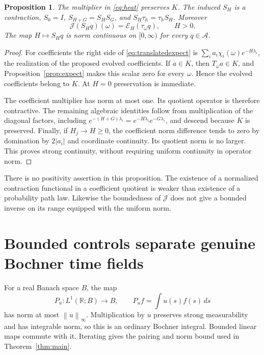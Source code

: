 \documentclass[11pt]{article}
\newtheorem{proposition}[theorem]{Proposition}
\theoremstyle{remark}\newtheorem{remark}[theorem]{Remark}
\newcommand{\R}{\mathbb R}\newcommand{\C}{\mathbb C}
\newcommand{\A}{\mathcal A}\newcommand{\X}{\mathcal X}
\newcommand{\E}{\mathcal E}\newcommand{\norm}[1]{\left\lVert#1\right\rVert}
\begin{document}
\begin{proposition}\label{prop:heat}
The multiplier in \eqref{eq:heat} preserves $K$. The induced $S_H$ is a contraction, $S_0=I$, $S_{H+G}=S_HS_G$, and $S_H\tau_h=\tau_hS_H$. Moreover
\begin{equation}\label{eq:translatedexpect}
 \mathcal J(S_Hq)(\omega)=\E_H(\tau_\omega q),\qquad H>0.
\end{equation}
The map $H\mapsto S_Hq$ is norm continuous on $[0,\infty)$ for every $q\in\A$.
\end{proposition}
\begin{proof}
For coefficients the right side of \eqref{eq:translatedexpect} is $\sum_i a_i\chi_i(\omega)e^{-H\lambda_i}$, the realization of the proposed evolved coefficients. If $a\in K$, then $T_\omega a\in K$, and Proposition~\ref{prop:expect} makes this scalar zero for every $\omega$. Hence the evolved coefficients belong to $K$. At $H=0$ preservation is immediate.

The coefficient multiplier has norm at most one. Its quotient operator is therefore contractive. The remaining algebraic identities follow from multiplication of the diagonal factors, including $e^{-(H+G)\lambda_i}=e^{-H\lambda_i}e^{-G\lambda_i}$, and descend because $K$ is preserved. Finally, if $H_j\to H\ge0$, the coefficient norm difference tends to zero by domination by $2|a_i|$ and coordinate continuity. Its quotient norm is no larger. This proves strong continuity, without requiring uniform continuity in operator norm.
\end{proof}

There is no positivity assertion in this proposition. The existence of a normalized contraction functional in a coefficient quotient is weaker than existence of a probability path law. Likewise the boundedness of $\mathcal J$ does not give a bounded inverse on its range equipped with the uniform norm.

\section{Bounded controls separate genuine Bochner time fields}\label{sec:bochner}
For a real Banach space $B$, the map
\[
 P_u:L^1(\R;B)\to B,\qquad P_uf=\int u(s)f(s)\,ds
\]
has norm at most $\norm u_\infty$. Multiplication by $u$ preserves strong measurability and has integrable norm, so this is an ordinary Bochner integral. Bounded linear maps commute with it. Iterating gives the pairing and norm bound used in Theorem~\ref{thm:main}.
\end{document}
